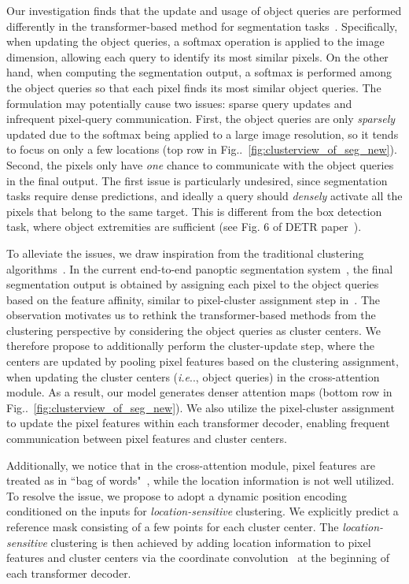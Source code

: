 \documentclass[10pt,twocolumn,letterpaper]{article}
\makeatletter
\DeclareRobustCommand\onedot{\futurelet\@let@token\@onedot}
\def\@onedot{\ifx\@let@token.\else.\null\fi\xspace}
\def\ie{\emph{i.e}\onedot} \def\Ie{\emph{I.e}\onedot}
\newcommand{\figref}[1]{Fig\onedot~\ref{#1}}
\makeatother
\begin{document}
Our investigation finds that the update and usage of object queries are performed differently in the transformer-based method for segmentation tasks~\cite{wang2021max}.
Specifically, when updating the object queries, a softmax operation is applied to the image dimension, allowing each query to identify its most similar pixels. On the other hand, when computing the segmentation output, a softmax is performed among the object queries so that each pixel finds its most similar object queries.
The formulation may potentially cause two issues: sparse query updates and infrequent pixel-query communication. First, the object queries are only {\it sparsely} updated due to the softmax being applied to a large image resolution, so it tends to focus on only a few locations (top row in \figref{fig:clusterview_of_seg_new}). Second, the pixels only have {\it one} chance to communicate with the object queries in the final output. The first issue is particularly undesired, since segmentation tasks require dense predictions, and ideally a query should {\it densely} activate all the pixels that belong to the same target. This is different from the box detection task, where object extremities are sufficient (see Fig. 6 of DETR paper~\cite{carion2020end}).

To alleviate the issues, we draw inspiration from the traditional clustering algorithms~\cite{lloyd1982least,achanta2012slic}. In the current end-to-end panoptic segmentation system~\cite{wang2021max}, the final segmentation output is obtained by assigning each pixel to the object queries based on the feature affinity, similar to pixel-cluster assignment step in~\cite{lloyd1982least,achanta2012slic}. The observation motivates us to rethink the transformer-based methods from the clustering perspective by considering the object queries as cluster centers.
We therefore propose to additionally perform the cluster-update step, where the centers are updated by pooling pixel features based on the clustering assignment, when updating the cluster centers (\ie, object queries) in the cross-attention module. As a result, our model generates denser attention maps (bottom row in \figref{fig:clusterview_of_seg_new}). We also utilize the pixel-cluster assignment to update the pixel features within each transformer decoder, enabling frequent communication between pixel features and cluster centers.

Additionally, we notice that in the cross-attention module, pixel features are treated as in ``bag of words"~\cite{lazebnik2006beyond}, while the location information is not well utilized. To resolve the issue, we propose to adopt a dynamic position encoding conditioned on the inputs for {\it location-sensitive} clustering. 
We explicitly predict a reference mask consisting of a few points for each cluster center. The {\it location-sensitive} clustering is then achieved by adding location information to pixel features and cluster
centers via the coordinate convolution~\cite{liu2018intriguing} at the beginning of each transformer decoder.
\end{document}
